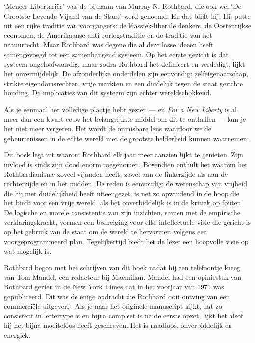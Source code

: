 \documentclass[
  a5paper,
  smalldemyvopaper,10pt,twoside,onecolumn,openright,extrafontsizes,hidelinks]{memoir}
\begin{document}
`Meneer Libertariër' was de bijnaam van Murray N. Rothbard, die ook wel
`De Grootste Levende Vijand van de Staat' werd genoemd. En dat blijft
hij. Hij putte uit een rijke traditie van voorgangers: de
klassiek-liberale denkers, de Oostenrijkse economen, de Amerikaanse
anti-oorlogstraditie en de traditie van het natuurrecht. Maar Rothbard
was degene die al deze losse ideeën heeft samengevoegd tot een
samenhangend systeem. Op het eerste gezicht is dat systeem
ongeloofwaardig, maar zodra Rothbard het definieert en verdedigt, lijkt
het onvermijdelijk. De afzonderlijke onderdelen zijn eenvoudig:
zelfeigenaarschap, strikte eigendomsrechten, vrije markten en een
duidelijk tegen de staat gerichte houding. De implicaties van dit
systeem zijn echter wereldschokkend.

Als je eenmaal het volledige plaatje hebt gezien --- en \emph{For a New
Liberty} is al meer dan een kwart eeuw het belangrijkste middel om dit
te onthullen --- kun je het niet meer vergeten. Het wordt de onmisbare
lens waardoor we de gebeurtenissen in de echte wereld met de grootste
helderheid kunnen waarnemen.

Dit boek legt uit waarom Rothbard elk jaar meer aanzien lijkt te
genieten. Zijn invloed is sinds zijn dood enorm toegenomen. Bovendien
onthult het waarom het Rothbardianisme zoveel vijanden heeft, zowel aan
de linkerzijde als aan de rechterzijde en in het midden. De reden is
eenvoudig: de wetenschap van vrijheid die hij met duidelijkheid heeft
uiteengezet, is net zo opwindend in de hoop die het biedt voor een vrije
wereld, als het onverbiddelijk is in de kritiek op fouten. De logische
en morele consistentie van zijn inzichten, samen met de empirische
verklaringskracht, vormen een bedreiging voor elke intellectuele visie
die gericht is op het gebruik van de staat om de wereld te hervormen
volgens een voorgeprogrammeerd plan. Tegelijkertijd biedt het de lezer
een hoopvolle visie op wat mogelijk is.

Rothbard begon met het schrijven van dit boek nadat hij een telefoontje
kreeg van Tom Mandel, een redacteur bij Macmillan. Mandel had een
opiniestuk van Rothbard gezien in de New York Times dat in het voorjaar
van 1971 was gepubliceerd. Dit was de enige opdracht die Rothbard ooit
ontving van een commerciële uitgeverij. Als je naar het originele
manuscript kijkt, dat zo consistent in lettertype is en bijna compleet
is na de eerste opzet, lijkt het alsof hij het bijna moeiteloos heeft
geschreven. Het is naadloos, onverbiddelijk en energiek.
\end{document}

